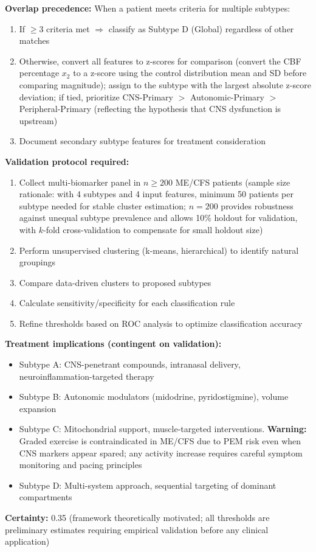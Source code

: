 \begin{speculation}
\textbf{Overlap precedence:} When a patient meets criteria for multiple subtypes:
\begin{enumerate}
    \item If $\geq 3$ criteria met $\Rightarrow$ classify as Subtype D (Global) regardless of other matches
    \item Otherwise, convert all features to z-scores for comparison (convert the CBF percentage $x_2$ to a z-score using the control distribution mean and SD before comparing magnitude); assign to the subtype with the largest absolute z-score deviation; if tied, prioritize CNS-Primary $>$ Autonomic-Primary $>$ Peripheral-Primary (reflecting the hypothesis that CNS dysfunction is upstream)
    \item Document secondary subtype features for treatment consideration
\end{enumerate}

\textbf{Validation protocol required:}
\begin{enumerate}
    \item Collect multi-biomarker panel in $n \geq 200$ ME/CFS patients (sample size rationale: with 4 subtypes and 4 input features, minimum 50 patients per subtype needed for stable cluster estimation; $n = 200$ provides robustness against unequal subtype prevalence and allows 10\% holdout for validation, with $k$-fold cross-validation to compensate for small holdout size)
    \item Perform unsupervised clustering (k-means, hierarchical) to identify natural groupings
    \item Compare data-driven clusters to proposed subtypes
    \item Calculate sensitivity/specificity for each classification rule
    \item Refine thresholds based on ROC analysis to optimize classification accuracy
\end{enumerate}

\textbf{Treatment implications (contingent on validation):}
\begin{itemize}
    \item Subtype A: CNS-penetrant compounds, intranasal delivery, neuroinflammation-targeted therapy
    \item Subtype B: Autonomic modulators (midodrine, pyridostigmine), volume expansion
    \item Subtype C: Mitochondrial support, muscle-targeted interventions. \textbf{Warning:} Graded exercise is contraindicated in ME/CFS due to PEM risk even when CNS markers appear spared; any activity increase requires careful symptom monitoring and pacing principles~\cite{NICE2021mecfs}
    \item Subtype D: Multi-system approach, sequential targeting of dominant compartments
\end{itemize}

\textbf{Certainty:} 0.35 (framework theoretically motivated; all thresholds are preliminary estimates requiring empirical validation before any clinical application)
\end{speculation}

